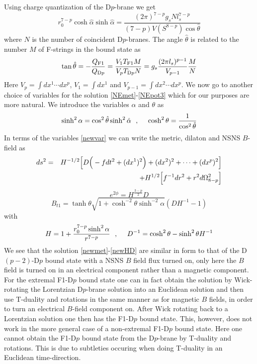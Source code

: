 \documentclass[a4paper,twoside,titlepage,12pt]{article}
\begin{document}
Using charge quantization of the D$p$-brane we get
%
\begin{equation}
\label{chaqua}
r_0^{7-p} \cosh \hat{\alpha} \sinh \hat{\alpha} 
= \frac{(2\pi)^{7-p} g_s N l_s^{7-p}}{(7-p) V( S^{8-p} ) \cos \hat{\theta}}
\end{equation}
%
where $N$ is the number of coincident D$p$-branes.
The angle $\hat{\theta}$ is related to the number $M$ of F-strings
in the bound state as
%
\begin{equation}
\label{hattheta}
\tan \hat{\theta} = - \frac{Q_{\rm F1}}{Q_{{\rm D}p}} 
= \frac{V_1 T_{\rm F1} M}{V_p T_{{\rm D}p} N}
= g_s \frac{(2\pi l_s )^{p-1} }{V_{p-1}} \frac{M}{N}
\end{equation}
%
Here $V_p = \int dx^1 \cdots dx^p$, $V_1 = \int dx^1$ and 
$V_{p-1} = \int dx^2 \cdots dx^p$.
We now go to another choice of variables for the solution
\eqref{NEmet}-\eqref{NEpot3} which for our purposes are more natural.
We introduce the variables $\alpha$ and $\theta$ as
%
\begin{equation}
\label{newvar}
\sinh^2 \alpha = \cos^2 \hat{\theta} \sinh^2 \hat{\alpha} \ \ ,\ \ \ \ 
\cosh^2 \theta = \frac{1}{\cos^2 \hat{\theta}}
\end{equation}
%
In terms of the variables \eqref{newvar} 
we can write the metric, dilaton and NSNS $B$-field as
%
\begin{eqnarray}
\label{newmet}
ds^2 &=& H^{-1/2} \Big[ D \Big( - f dt^2 + (dx^1)^2 \Big)
+  (dx^2)^2 + \cdots + (dx^p)^2 \Big]
\nonumber \\ && + H^{1/2} \Big[ f^{-1} dr^2 + r^2 d\Omega_{8-p}^2 \Big]
\end{eqnarray}
%
\begin{equation}
\label{newdil}
e^{2\phi} = H^{\frac{3-p}{2}} D
\end{equation}
%
\begin{equation}
\label{newpot}
B_{t1} = \tanh \theta \sqrt{ 1 + \cosh^{-2} \theta \sinh^{-2} \alpha }
( D H^{-1} - 1 )
\end{equation}
%
with
%
\begin{equation}
\label{newHD}
H = 1 + \frac{r_0^{7-p} \sinh^2 \alpha}{r^{7-p}} \ \ ,\ \ \ \ 
D^{-1} = \cosh^2 \theta - \sinh^2 \theta H^{-1}
\end{equation}
%
We see that the solution \eqref{newmet}-\eqref{newHD} are similar in form
to that of the D$(p-2)$-D$p$ bound state with a NSNS $B$ field flux 
turned on, only here the $B$ field is turned on in an electrical
component rather than a magnetic component. 
For the extremal F1-D$p$ bound state one can in fact obtain
the solution by Wick-rotating the Lorentzian D$p$-brane solution
into an Euclidean solution and then use T-duality and rotations
in the same manner as for magnetic $B$ fields, in order to turn
an electrical $B$-field component on\cite{Maldacena:1999mh}. 
After Wick rotating back
to a Lorentzian solution one then has the F1-D$p$ bound state.
This, however, does not work in the more general case of a non-extremal
F1-D$p$ bound state. Here one cannot obtain the F1-D$p$ bound state
from the D$p$-brane by T-duality and rotations.
This is due to subtleties occuring when doing T-duality in an Euclidean 
time-direction\cite{Hull:1998vg}.
\end{document}
